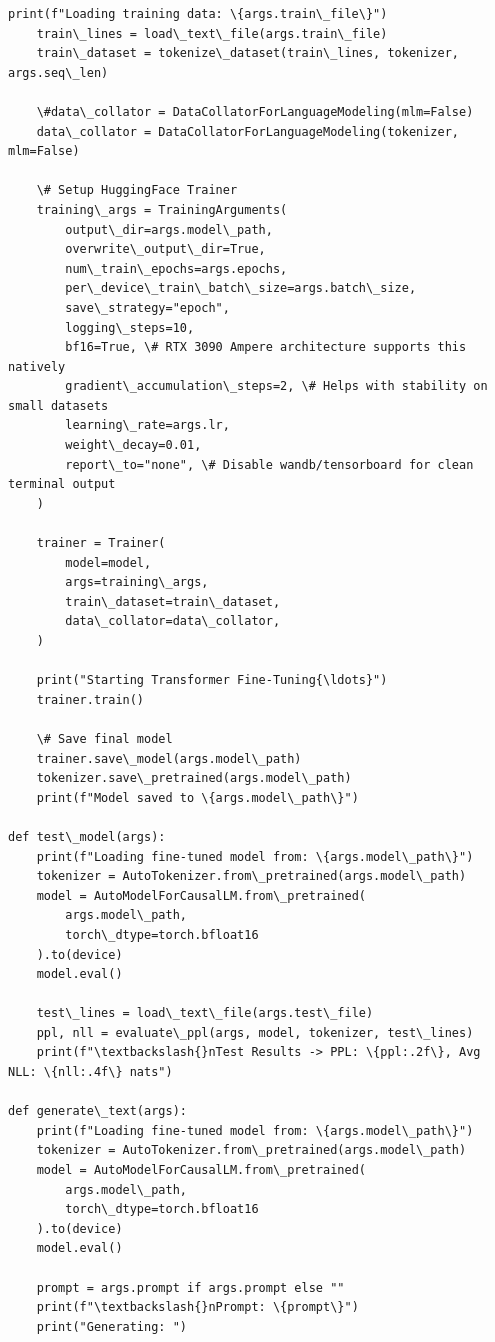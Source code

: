 \documentclass[11pt]{article}
\begin{document}
\begin{Verbatim}[commandchars=\\\{\}]
    print(f"Loading training data: \{args.train\_file\}")
    train\_lines = load\_text\_file(args.train\_file)
    train\_dataset = tokenize\_dataset(train\_lines, tokenizer, args.seq\_len)

    \#data\_collator = DataCollatorForLanguageModeling(mlm=False)
    data\_collator = DataCollatorForLanguageModeling(tokenizer, mlm=False)

    \# Setup HuggingFace Trainer
    training\_args = TrainingArguments(
        output\_dir=args.model\_path,
        overwrite\_output\_dir=True,
        num\_train\_epochs=args.epochs,
        per\_device\_train\_batch\_size=args.batch\_size,
        save\_strategy="epoch",
        logging\_steps=10,
        bf16=True, \# RTX 3090 Ampere architecture supports this natively
        gradient\_accumulation\_steps=2, \# Helps with stability on small datasets
        learning\_rate=args.lr,
        weight\_decay=0.01,
        report\_to="none", \# Disable wandb/tensorboard for clean terminal output
    )

    trainer = Trainer(
        model=model,
        args=training\_args,
        train\_dataset=train\_dataset,
        data\_collator=data\_collator,
    )

    print("Starting Transformer Fine-Tuning{\ldots}")
    trainer.train()

    \# Save final model
    trainer.save\_model(args.model\_path)
    tokenizer.save\_pretrained(args.model\_path)
    print(f"Model saved to \{args.model\_path\}")

def test\_model(args):
    print(f"Loading fine-tuned model from: \{args.model\_path\}")
    tokenizer = AutoTokenizer.from\_pretrained(args.model\_path)
    model = AutoModelForCausalLM.from\_pretrained(
        args.model\_path,
        torch\_dtype=torch.bfloat16
    ).to(device)
    model.eval()

    test\_lines = load\_text\_file(args.test\_file)
    ppl, nll = evaluate\_ppl(args, model, tokenizer, test\_lines)
    print(f"\textbackslash{}nTest Results -> PPL: \{ppl:.2f\}, Avg NLL: \{nll:.4f\} nats")

def generate\_text(args):
    print(f"Loading fine-tuned model from: \{args.model\_path\}")
    tokenizer = AutoTokenizer.from\_pretrained(args.model\_path)
    model = AutoModelForCausalLM.from\_pretrained(
        args.model\_path,
        torch\_dtype=torch.bfloat16
    ).to(device)
    model.eval()

    prompt = args.prompt if args.prompt else ""
    print(f"\textbackslash{}nPrompt: \{prompt\}")
    print("Generating: ")


\end{Verbatim}
\end{document}
